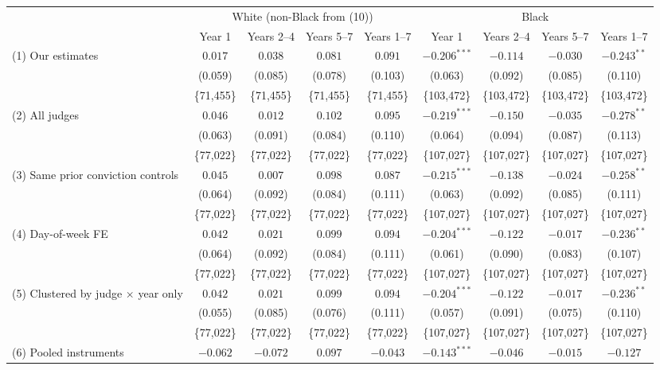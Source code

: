 \begin{tabular}{lcccccccc}
\toprule
 & \multicolumn{4}{c}{White (non-Black from (10))} & \multicolumn{4}{c}{Black} \\
\cmidrule(lr){2-5}\cmidrule(lr){6-9}
 & Year 1 & Years 2--4 & Years 5--7 & Years 1--7 & Year 1 & Years 2--4 & Years 5--7 & Years 1--7 \\
\midrule
(1) Our estimates & $0.017$ & $0.038$ & $0.081$ & $0.091$ & $-0.206^{***}$ & $-0.114$ & $-0.030$ & $-0.243^{**}$ \\
 & (0.059) & (0.085) & (0.078) & (0.103) & (0.063) & (0.092) & (0.085) & (0.110) \\
 & \{71,455\} & \{71,455\} & \{71,455\} & \{71,455\} & \{103,472\} & \{103,472\} & \{103,472\} & \{103,472\} \\
(2) All judges & $0.046$ & $0.012$ & $0.102$ & $0.095$ & $-0.219^{***}$ & $-0.150$ & $-0.035$ & $-0.278^{**}$ \\
 & (0.063) & (0.091) & (0.084) & (0.110) & (0.064) & (0.094) & (0.087) & (0.113) \\
 & \{77,022\} & \{77,022\} & \{77,022\} & \{77,022\} & \{107,027\} & \{107,027\} & \{107,027\} & \{107,027\} \\
(3) Same prior conviction controls & $0.045$ & $0.007$ & $0.098$ & $0.087$ & $-0.215^{***}$ & $-0.138$ & $-0.024$ & $-0.258^{**}$ \\
 & (0.064) & (0.092) & (0.084) & (0.111) & (0.063) & (0.092) & (0.085) & (0.111) \\
 & \{77,022\} & \{77,022\} & \{77,022\} & \{77,022\} & \{107,027\} & \{107,027\} & \{107,027\} & \{107,027\} \\
(4) Day-of-week FE & $0.042$ & $0.021$ & $0.099$ & $0.094$ & $-0.204^{***}$ & $-0.122$ & $-0.017$ & $-0.236^{**}$ \\
 & (0.064) & (0.092) & (0.084) & (0.111) & (0.061) & (0.090) & (0.083) & (0.107) \\
 & \{77,022\} & \{77,022\} & \{77,022\} & \{77,022\} & \{107,027\} & \{107,027\} & \{107,027\} & \{107,027\} \\
(5) Clustered by judge $\times$ year only & $0.042$ & $0.021$ & $0.099$ & $0.094$ & $-0.204^{***}$ & $-0.122$ & $-0.017$ & $-0.236^{**}$ \\
 & (0.055) & (0.085) & (0.076) & (0.111) & (0.057) & (0.091) & (0.075) & (0.110) \\
 & \{77,022\} & \{77,022\} & \{77,022\} & \{77,022\} & \{107,027\} & \{107,027\} & \{107,027\} & \{107,027\} \\
(6) Pooled instruments & $-0.062$ & $-0.072$ & $0.097$ & $-0.043$ & $-0.143^{***}$ & $-0.046$ & $-0.015$ & $-0.127$ \\

\end{tabular}
